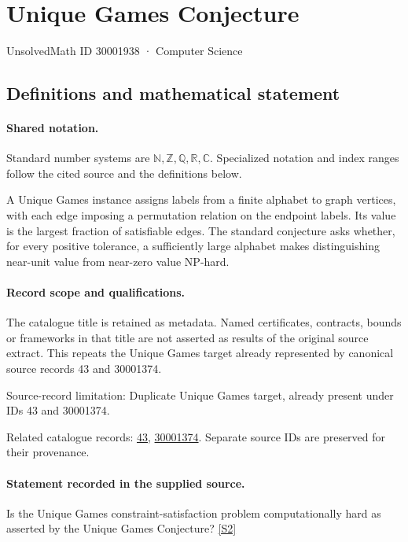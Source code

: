 \documentclass[11pt]{article}
\newcommand{\sref}[2]{\hyperlink{source:#1:#2}{[S#2]}}
\begin{document}
\setcounter{section}{30001937}
\section{Unique Games Conjecture}\label{30001938}
{\small\sffamily UnsolvedMath ID 30001938 · Computer Science}
\subsection{Definitions and mathematical statement}

\paragraph{Shared notation.}Standard number systems are $\mathbb N,\mathbb Z,\mathbb Q,\mathbb R,\mathbb C$. Specialized notation and index ranges follow the cited source and the definitions below.


A Unique Games instance assigns labels from a finite alphabet to graph vertices, with each edge imposing a permutation relation on the endpoint labels. Its value is the largest fraction of satisfiable edges. The standard conjecture asks whether, for every positive tolerance, a sufficiently large alphabet makes distinguishing near-unit value from near-zero value NP-hard.
\paragraph{Record scope and qualifications.}
The catalogue title is retained as metadata. Named certificates, contracts, bounds or frameworks in that title are not asserted as results of the original source extract.
This repeats the Unique Games target already represented by canonical source records 43 and 30001374.

Source-record limitation: Duplicate Unique Games target, already present under IDs 43 and 30001374.

Related catalogue records: \href{https://mehmetmars7.github.io/Erdosproblems-llm-hunter/problem.html?type=open_problems&id=43}{43}, \href{https://mehmetmars7.github.io/Erdosproblems-llm-hunter/problem.html?type=open_problems&id=30001374}{30001374}. Separate source IDs are preserved for their provenance.
\paragraph{Statement recorded in the supplied source.}
Is the Unique Games constraint-satisfaction problem computationally hard as asserted by the Unique Games Conjecture? \sref{30001938}{2}
\end{document}
